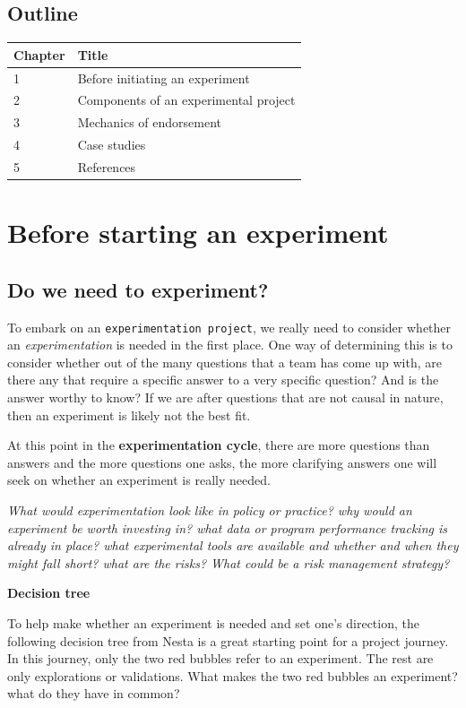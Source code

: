 \documentclass[]{book}
\begin{document}
\hypertarget{outline}{%
\section{Outline}\label{outline}}

\begin{longtable}[]{@{}ll@{}}
\toprule
Chapter & Title\tabularnewline
\midrule
\endhead
1 & Before initiating an experiment\tabularnewline
2 & Components of an experimental project\tabularnewline
3 & Mechanics of endorsement\tabularnewline
4 & Case studies\tabularnewline
5 & References\tabularnewline
\bottomrule
\end{longtable}

\hypertarget{before-starting-an-experiment}{%
\chapter{Before starting an experiment}\label{before-starting-an-experiment}}

\hypertarget{do-we-need-to-experiment}{%
\section{Do we need to experiment?}\label{do-we-need-to-experiment}}

To embark on an \texttt{experimentation\ project}, we really need to consider whether an \emph{experimentation} is needed in the first place. One way of determining this is to consider whether out of the many questions that a team has come up with, are there any that require a specific answer to a very specific question? And is the answer worthy to know? If we are after questions that are not causal in nature, then an experiment is likely not the best fit.

At this point in the \textbf{experimentation cycle}, there are more questions than answers and the more questions one asks, the more clarifying answers one will seek on whether an experiment is really needed.

\emph{What would experimentation look like in policy or practice? why would an experiment be worth investing in? what data or program performance tracking is already in place? what experimental tools are available and whether and when they might fall short? what are the risks? What could be a risk management strategy?}

\textbf{Decision tree}

To help make whether an experiment is needed and set one's direction, the following decision tree from Nesta is a great starting point for a project journey. In this journey, only the two red bubbles refer to an experiment. The rest are only explorations or validations.
What makes the two red bubbles an experiment? what do they have in common?
\end{document}
